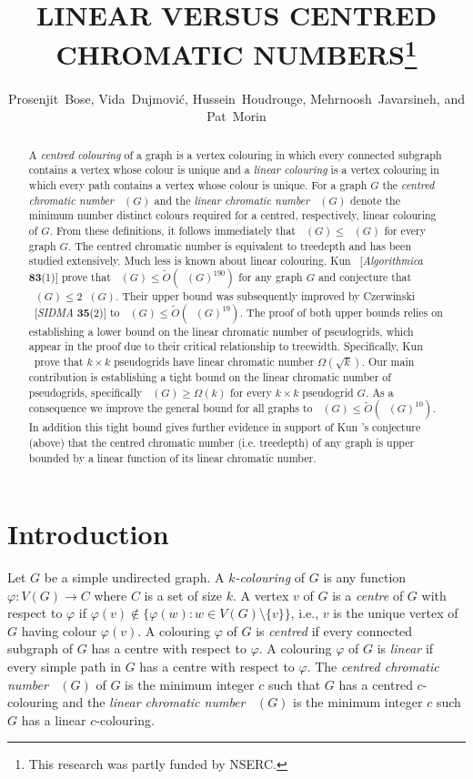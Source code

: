 \documentclass{patmorin}
\title{\MakeUppercase{Linear versus centred chromatic numbers}\thanks{This research was partly funded by NSERC.}}
\author{Prosenjit~Bose, Vida~Dujmović, Hussein~Houdrouge, Mehrnoosh~Javarsineh, and Pat~Morin}
\date{}
\newcommand{\defin}[1]{\emph{\color{brightmaroon}#1}}
\DeclareMathOperator{\chicen}{\chi_{\mathrm{cen}}}
\DeclareMathOperator{\chilin}{\chi_{\mathrm{lin}}}
\begin{document}
\maketitle
\renewcommand{\E}{\mathbb{E}}
\renewcommand{\Pr}{\mathbb{P}}

\begin{abstract}
  A \emph{centred colouring} of a graph is a vertex colouring in which every connected subgraph contains a vertex whose colour is unique and a \emph{linear colouring} is a vertex colouring in which every path contains a vertex whose colour is unique.  For a graph $G$ the \emph{centred chromatic number} $\chicen(G)$ and the \emph{linear chromatic number} $\chilin(G)$ denote the minimum number distinct colours required for a centred, respectively, linear colouring of $G$. From these definitions, it follows immediately that $\chilin(G)\le \chicen(G)$ for every graph $G$. The centred chromatic number is equivalent to treedepth and has been studied extensively. Much less is known about linear colouring.  Kun \etal\ [\textit{Algorithmica} \textbf{83}(1)] prove that $\chicen(G) \le \tilde{O}(\chilin(G)^{190})$ for any graph $G$ and conjecture that $\chicen(G)\le 2\chilin(G)$.  Their upper bound was subsequently improved by Czerwinski \etal\ [\textit{SIDMA} \textbf{35}(2)] to $\chicen(G)\le\tilde{O}(\chilin(G)^{19})$. The proof of both upper bounds relies on establishing a lower bound on the linear chromatic number of pseudogrids, which appear in the proof due to their critical relationship to treewidth.  Specifically, Kun \etal\ prove that $k\times k$ pseudogrids have linear chromatic number $\Omega(\sqrt{k})$. Our main contribution is establishing a tight bound on the linear chromatic number of pseudogrids, specifically $\chilin(G)\ge \Omega(k)$ for every $k\times k$ pseudogrid $G$. As a consequence we improve the general bound for all graphs to $\chicen(G)\le \tilde{O}(\chilin(G)^{10})$. In addition this tight bound gives further evidence in support of Kun \etal's conjecture (above) that the centred chromatic number (i.e. treedepth) of any graph is upper bounded by a linear function of its linear chromatic number.
\end{abstract}

\section{Introduction}

Let $G$ be a simple undirected graph.  A \defin{$k$-colouring} of $G$ is any function $\varphi:V(G)\to C$ where $C$ is a set of size $k$.  A vertex $v$ of $G$ is a \defin{centre} of $G$ with respect to $\varphi$ if $\varphi(v)\not\in\{\varphi(w):w\in V(G)\setminus\{v\}\}$, i.e., $v$ is the unique vertex of $G$ having colour $\varphi(v)$.  A colouring $\varphi$ of $G$ is \defin{centred} if every connected subgraph of $G$ has a centre with respect to $\varphi$. A colouring $\varphi$ of $G$ is \defin{linear} if every simple path in $G$ has a centre with respect to $\varphi$. The \defin{centred chromatic number} $\chicen(G)$ of $G$ is the minimum integer $c$ such that $G$ has a centred $c$-colouring and the \defin{linear chromatic number} $\chilin(G)$ is the minimum integer $c$ such $G$ has a linear $c$-colouring.
\end{document}
